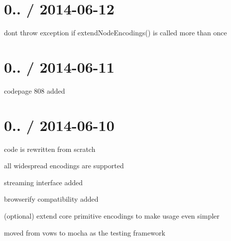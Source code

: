 \section*{0.. / 2014-\/06-\/12}


\begin{DoxyItemize}
\item don\textquotesingle{}t throw exception if {\ttfamily extend\+Node\+Encodings()} is called more than once
\end{DoxyItemize}

\section*{0.. / 2014-\/06-\/11}


\begin{DoxyItemize}
\item codepage 808 added
\end{DoxyItemize}

\section*{0.. / 2014-\/06-\/10}


\begin{DoxyItemize}
\item code is rewritten from scratch
\item all widespread encodings are supported
\item streaming interface added
\item browserify compatibility added
\item (optional) extend core primitive encodings to make usage even simpler
\item moved from vows to mocha as the testing framework 
\end{DoxyItemize}